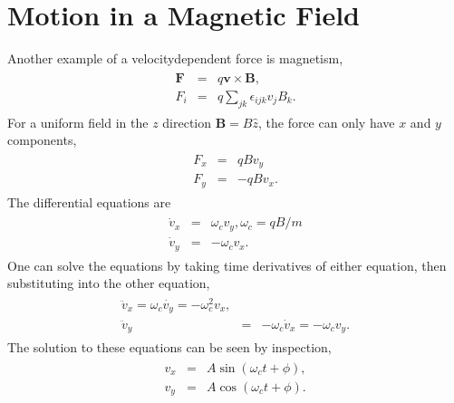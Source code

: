 \documentclass[letterpaper,10pt,english]{sphinxmanual}
\begin{document}
\section{Motion in a Magnetic Field}
\label{\detokenize{chapter1:motion-in-a-magnetic-field}}
Another example of a velocity\sphinxhyphen{}dependent force is magnetism,
\begin{equation*}
\begin{split}
\begin{eqnarray}
\boldsymbol{F}&=&q\boldsymbol{v}\times\boldsymbol{B},\\
\nonumber
F_i&=&q\sum_{jk}\epsilon_{ijk}v_jB_k.
\end{eqnarray}
\end{split}
\end{equation*}
For a uniform field in the \(z\) direction \(\boldsymbol{B}=B\hat{z}\), the force can only have \(x\) and \(y\) components,
\begin{equation*}
\begin{split}
\begin{eqnarray}
F_x&=&qBv_y\\
\nonumber
F_y&=&-qBv_x.
\end{eqnarray}
\end{split}
\end{equation*}
The differential equations are
\begin{equation*}
\begin{split}
\begin{eqnarray}
\dot{v}_x&=&\omega_c v_y,\omega_c= qB/m\\
\nonumber
\dot{v}_y&=&-\omega_c v_x.
\end{eqnarray}
\end{split}
\end{equation*}
One can solve the equations by taking time derivatives of either equation, then substituting into the other equation,
\begin{equation*}
\begin{split}
\begin{eqnarray}
\ddot{v}_x=\omega_c\dot{v_y}=-\omega_c^2v_x,\\
\nonumber
\ddot{v}_y&=&-\omega_c\dot{v}_x=-\omega_cv_y.
\end{eqnarray}
\end{split}
\end{equation*}
The solution to these equations can be seen by inspection,
\begin{equation*}
\begin{split}
\begin{eqnarray}
v_x&=&A\sin(\omega_ct+\phi),\\
\nonumber
v_y&=&A\cos(\omega_ct+\phi).
\end{eqnarray}
\end{split}
\end{equation*}
\end{document}
